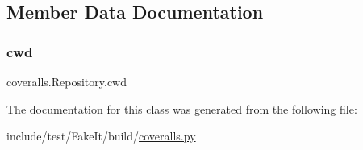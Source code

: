 \subsection{Member Data Documentation}
\mbox{\label{classcoveralls_1_1Repository_a11e205dc56f17f34fdb8f737f62aa8f9}} 
\subsubsection{\texorpdfstring{cwd}{cwd}}
{\footnotesize\ttfamily coveralls.\+Repository.\+cwd}



The documentation for this class was generated from the following file\+:\begin{DoxyCompactItemize}
\item 
include/test/\+Fake\+It/build/\mbox{\hyperlink{coveralls_8py}{coveralls.\+py}}\end{DoxyCompactItemize}
